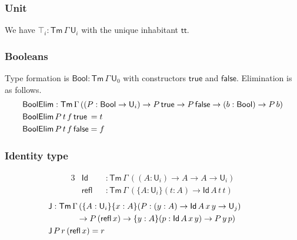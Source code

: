 \documentclass[acmsmall,screen,review]{acmart}
\newcommand{\msf}[1]{{\mathsf{#1}}}
\newcommand{\U}{\msf{U}}
\newcommand{\ttt}{\msf{tt}}
\newcommand{\Bool}{\msf{Bool}}
\newcommand{\Tm}{\msf{Tm}}
\newcommand{\true}{\msf{true}}
\newcommand{\false}{\msf{false}}
\newcommand{\BoolElim}{\msf{BoolElim}}
\newcommand{\Id}{\msf{Id}}
\newcommand{\refl}{\msf{refl}}
\newcommand{\J}{\msf{J}}
\begin{document}
\subsubsection{Unit} We have $\top_i : \Tm\,\Gamma\,\U_i$ with the unique inhabitant $\ttt$.

\subsubsection{Booleans} Type formation is $\Bool : \Tm\,\Gamma\,\U_0$ with constructors $\true$ and $\false$. Elimination is as follows.
\begin{alignat*}{3}
  &\BoolElim : \Tm\,\Gamma\,((P : \Bool \to \U_i) \to P\,\true \to P\,\false \to (b : \Bool) \to P\,b)\\
  & \BoolElim\,P\,t\,f\,\true\hspace{0.2em} = t\\
  & \BoolElim\,P\,t\,f\,\false = f
\end{alignat*}

\subsubsection{Identity type}
\begin{alignat*}{3}
  &\Id   &&: \Tm\,\Gamma\,((A : \U_i) \to A \to A \to \U_i)\\
  &\refl &&: \Tm\,\Gamma\,(\{A : \U_i\}(t : A) \to \Id\,A\,t\,t)
\end{alignat*}
\begin{alignat*}{3}
  &\J : \Tm\,\Gamma\,(\{A : \U_i\}\{x : A\}(P : (y : A) \to \Id\,A\,x\,y \to \U_j)\\
  & \hspace{3.5em}\to P\,(\refl\,x) \to \{y : A\}(p : \Id\,A\,x\,y) \to P\,y\,p)&&
  &\\
  &\J\,P\,r\,(\refl\,x) = r
\end{alignat*}
\end{document}
